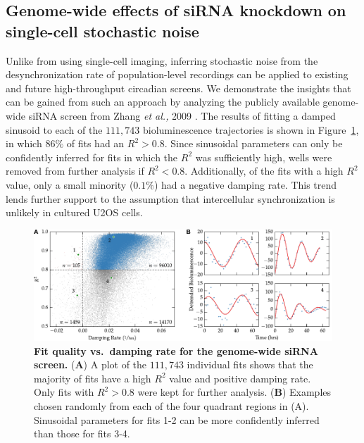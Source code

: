 \documentclass[11pt, letterpaper]{article}
\begin{document}
\subsection*{Genome-wide effects of siRNA knockdown on single-cell stochastic noise}

Unlike from using single-cell imaging, inferring stochastic noise from the desynchronization rate of population-level recordings can be applied to existing and future high-throughput circadian screens.
We demonstrate the insights that can be gained from such an approach by analyzing the publicly available genome-wide siRNA screen from Zhang {\itshape et al.,} 2009 \cite{Zhang2009}.
The results of fitting a damped sinusoid to each of the $111,743$ bioluminescence trajectories is shown in Figure~\ref{fig:fit_quality}, in which $86\%$ of fits had an $R^2 > 0.8$.
Since sinusoidal parameters can only be confidently inferred for fits in which the $R^2$ was sufficiently high, wells were removed from further analysis if $R^2 < 0.8$.
Additionally, of the fits with a high $R^2$ value, only a small minority ($0.1\%$) had a negative damping rate. This trend lends further support to the assumption that intercellular synchronization is unlikely in cultured U2OS cells. 

\begin{figure}[tbp]
  \begin{center}
    \includegraphics[]{figures/pdfs/r2_vs_damping.pdf}
  \end{center}
  \caption{{\bfseries Fit quality vs.\ damping rate for the genome-wide siRNA screen.}
({\bfseries A}) A plot of the $111,743$ individual fits shows that the majority of fits have a high $R^2$ value and positive damping rate. Only fits with $R^2 > 0.8$ were kept for further analysis.
({\bfseries B}) Examples chosen randomly from each of the four quadrant regions in (A). Sinusoidal parameters for fits 1-2 can be more confidently inferred than those for fits 3-4.}
\label{fig:fit_quality}
\end{figure}
\end{document}
